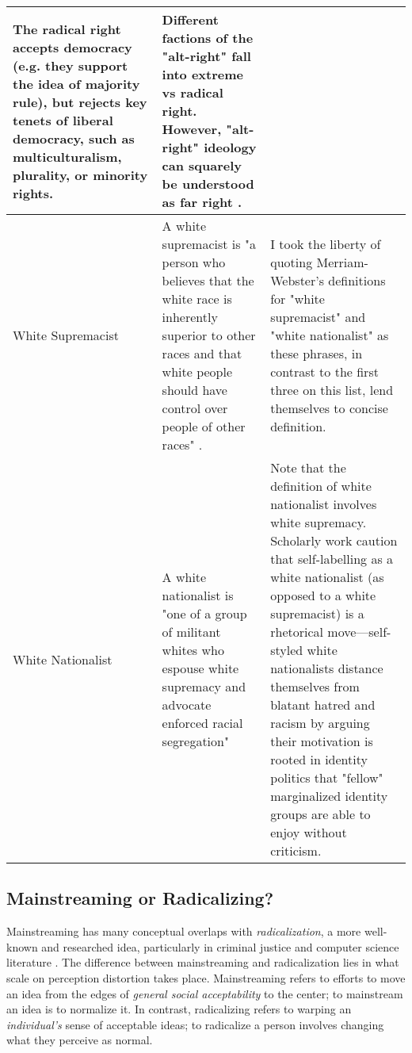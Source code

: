\documentclass[acmlarge, screen, authorversion]{acmart}
\begin{document}
\begin{table*}
\begin{tabular}{ p{3cm}  p{7cm}  p{6cm} }
  \medskip 
  
  The radical right accepts democracy (e.g. they support the idea of majority rule), but rejects key tenets of liberal democracy, such as multiculturalism, plurality, or minority rights. & Different factions of the "alt-right" fall into extreme vs radical right. However, "alt-right" ideology can squarely be understood as far right \cite{muddeFarRightToday2019}.\\
  \hline
  White Supremacist & A white supremacist is "a person who believes that the white race is inherently superior to other races and that white people should have control over people of other races" \cite{merriam-websterDefinitionWHITESUPREMACIST}. & I took the liberty of quoting Merriam-Webster's definitions for "white supremacist" and "white nationalist" as these phrases, in contrast to the first three on this list, lend themselves to concise definition.\\
  \hline
  White Nationalist & A white nationalist is "one of a group of militant whites who espouse white supremacy and advocate enforced racial segregation" \cite{merriam-websterDefinitionWHITENATIONALIST} & Note that the definition of white nationalist involves white supremacy. Scholarly work \cite{danielsAlgorithmicRiseAltRight2018,  hartzellAltWhiteConceptualizingAltRight} caution that self-labelling as a white nationalist (as opposed to a white supremacist) is a rhetorical move---self-styled white nationalists distance themselves from blatant hatred and racism by arguing their motivation is rooted in identity politics that "fellow" marginalized identity groups are able to enjoy without criticism. \\
  \bottomrule
\end{tabular}
\end{table*}

\subsection{Mainstreaming or Radicalizing?}

Mainstreaming has many conceptual overlaps with \textit{radicalization}, a more well-known and researched idea,
particularly in criminal justice and computer science literature \cite{torokDevelopingExplanatoryModel2013, groverDetectingPotentialWarning2019, ribeiroAuditingRadicalizationPathways2019}. The
difference between mainstreaming and radicalization lies in what scale on
perception distortion takes place. Mainstreaming refers to efforts to move an idea from the edges of \textit{general social acceptability} to the center; to mainstream an idea is to
normalize it. In contrast, radicalizing refers to warping an \textit{individual's} sense of acceptable
ideas; to radicalize a person involves changing what they perceive as normal.
\end{document}
